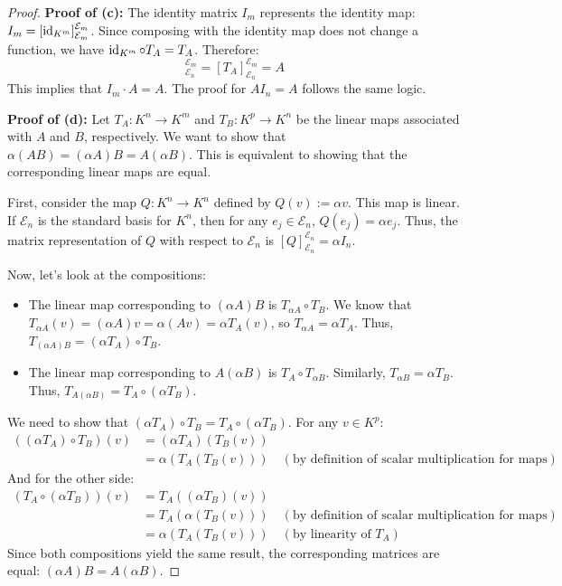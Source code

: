 \begin{proof}
\textbf{Proof of (c):} The identity matrix $I_m$ represents the identity map: $I_m = [\operatorname{id}_{K^m}]_{\mathcal{E}_m}^{\mathcal{E}_m}$. Since composing with the identity map does not change a function, we have $\operatorname{id}_{K^m} \circ T_A = T_A$. Therefore:
\begin{equation*}
    [\id_{K^m} \circ T_A]_{\mathcal{E}_n}^{\mathcal{E}_m} = [T_A]_{\mathcal{E}_n}^{\mathcal{E}_m} = A
\end{equation*}
This implies that $I_m \cdot A = A$. The proof for $A I_n = A$ follows the same logic.

\textbf{Proof of (d):} Let $T_A: K^n \to K^m$ and $T_B: K^p \to K^n$ be the linear maps associated with $A$ and $B$, respectively. We want to show that $\alpha(AB) = (\alpha A)B = A(\alpha B)$. This is equivalent to showing that the corresponding linear maps are equal.

First, consider the map $Q: K^n \to K^n$ defined by $Q(v) := \alpha v$. This map is linear. If $\mathcal{E}_n$ is the standard basis for $K^n$, then for any $e_j \in \mathcal{E}_n$, $Q(e_j) = \alpha e_j$. Thus, the matrix representation of $Q$ with respect to $\mathcal{E}_n$ is $[Q]_{\mathcal{E}_n}^{\mathcal{E}_n} = \alpha I_n$.

Now, let's look at the compositions:
\begin{itemize}
    \item The linear map corresponding to $(\alpha A)B$ is $T_{\alpha A} \circ T_B$. We know that $T_{\alpha A}(v) = (\alpha A)v = \alpha(Av) = \alpha T_A(v)$, so $T_{\alpha A} = \alpha T_A$. Thus, $T_{(\alpha A)B} = (\alpha T_A) \circ T_B$.
    \item The linear map corresponding to $A(\alpha B)$ is $T_A \circ T_{\alpha B}$. Similarly, $T_{\alpha B} = \alpha T_B$. Thus, $T_{A(\alpha B)} = T_A \circ (\alpha T_B)$.
\end{itemize}

We need to show that $(\alpha T_A) \circ T_B = T_A \circ (\alpha T_B)$. For any $v \in K^p$:
\begin{align*}
    ((\alpha T_A) \circ T_B)(v) &= (\alpha T_A)(T_B(v)) \\
    &= \alpha (T_A(T_B(v))) \quad (\text{by definition of scalar multiplication for maps})
\end{align*}
And for the other side:
\begin{align*}
    (T_A \circ (\alpha T_B))(v) &= T_A((\alpha T_B)(v)) \\
    &= T_A(\alpha (T_B(v))) \quad (\text{by definition of scalar multiplication for maps}) \\
    &= \alpha (T_A(T_B(v))) \quad (\text{by linearity of } T_A)
\end{align*}
Since both compositions yield the same result, the corresponding matrices are equal: $(\alpha A)B = A(\alpha B)$.


\end{proof}
